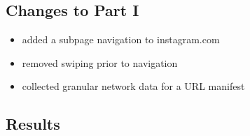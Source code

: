\documentclass{article}
\begin{document}
\subsection{Changes to Part I}
\begin{itemize}
    \item added a subpage navigation to instagram.com
    \item removed swiping prior to navigation
    \item collected granular network data for a URL manifest
\end{itemize}

\subsection{Results}

\end{document}

